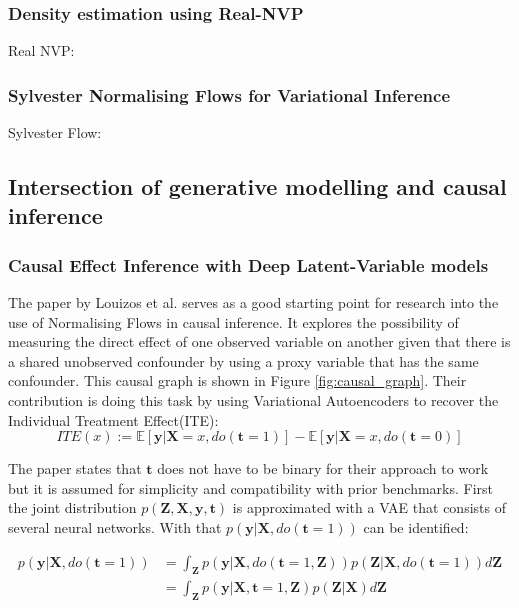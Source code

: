 \documentclass{article}
\newcommand{\bt}{\mathbf{t}}
\newcommand{\bX}{\mathbf{X}}
\newcommand{\by}{\mathbf{y}}
\newcommand{\bZ}{\mathbf{Z}}
\begin{document}
\subsubsection*{Density estimation using Real-NVP}
Real NVP: \cite{dinh2016density}

\subsubsection*{Sylvester Normalising Flows for Variational Inference}
Sylvester Flow: \cite{berg2018sylvester}


\subsection{Intersection of generative modelling and causal inference}

\subsubsection*{Causal Effect Inference with Deep Latent-Variable models}
The paper by Louizos et al.\cite{louizos2017causal} serves as a good starting point for research into the use of Normalising Flows in causal inference. It explores the possibility of measuring the direct effect of one observed variable on another given that there is a shared unobserved confounder by using a proxy variable that has the same confounder. This causal graph is shown in Figure \ref{fig:causal_graph}. Their contribution is doing this task by using Variational Autoencoders\cite{kingma2013auto} to recover the Individual Treatment Effect(ITE):
\begin{equation}\label{equation:ITE}
    ITE(x) := \mathbb{E}[\by | \bX = x, do(\bt = 1)] - \mathbb{E}[\by | \bX = x, do(\bt=0)]
\end{equation}

\noindent
The paper states that $\bt$ does not have to be binary for their approach to work but it is assumed for simplicity and compatibility with prior benchmarks. First the joint distribution $p(\bZ, \bX, \by, \bt)$ is approximated with a VAE that consists of several neural networks. With that $p(\by | \bX, do(\bt=1))$ can be identified:

\begin{equation}\label{equation:intervention}
    \begin{split}
    p(\by | \bX, do(\bt=1)) &= \int_\bZ p(\by | \bX, do(\bt=1, \bZ)) p(\bZ | \bX, do(\bt = 1)) d\bZ \\
                            &= \int_\bZ p(\by | \bX, \bt = 1, \bZ) p(\bZ | \bX) d\bZ
    \end{split}
\end{equation}
\end{document}
